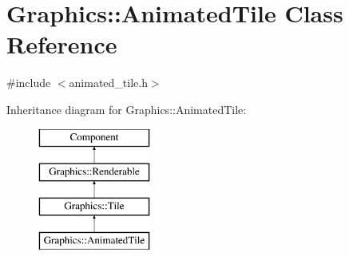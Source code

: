 \hypertarget{class_graphics_1_1_animated_tile}{}\section{Graphics\+:\+:Animated\+Tile Class Reference}
\label{class_graphics_1_1_animated_tile}


{\ttfamily \#include $<$animated\+\_\+tile.\+h$>$}

Inheritance diagram for Graphics\+:\+:Animated\+Tile\+:\begin{figure}[H]
\begin{center}
\leavevmode
\includegraphics[height=4.000000cm]{class_graphics_1_1_animated_tile}
\end{center}
\end{figure}
